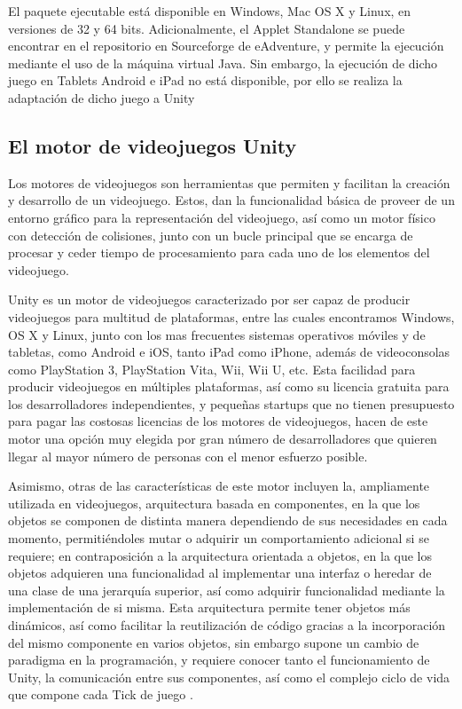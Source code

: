 El paquete ejecutable está disponible en Windows, Mac OS X y Linux, en versiones de 32 y 64 bits. Adicionalmente, el Applet Standalone se puede encontrar en el repositorio en Sourceforge de eAdventure, y permite la ejecución mediante el uso de la máquina virtual Java. Sin embargo, la ejecución de dicho juego en Tablets Android e iPad no está disponible, por ello se realiza la adaptación de dicho juego a Unity 

\subsection{El motor de videojuegos Unity}

Los motores de videojuegos son herramientas que permiten y facilitan la creación y desarrollo de un videojuego. Estos, dan la funcionalidad básica de proveer de un entorno gráfico para la representación del videojuego, así como un motor físico con detección de colisiones, junto con un bucle principal que se encarga de procesar y ceder tiempo de procesamiento para cada uno de los elementos del videojuego.

Unity es un motor de videojuegos caracterizado por ser capaz de producir videojuegos para multitud de plataformas, entre las cuales encontramos Windows, OS X y Linux, junto con los mas frecuentes sistemas operativos móviles y de tabletas, como Android e  iOS, tanto iPad como iPhone, además de videoconsolas como PlayStation 3, PlayStation Vita, Wii, Wii U, etc. Esta facilidad para producir videojuegos en múltiples plataformas, así como su licencia gratuita para los desarrolladores independientes, y pequeñas startups que no tienen presupuesto para pagar las costosas licencias de los motores de videojuegos, hacen de este motor una opción muy elegida por gran número de desarrolladores que quieren llegar al mayor número de personas con el menor esfuerzo posible.

Asimismo, otras de las características de este motor incluyen la, ampliamente utilizada en videojuegos, arquitectura basada en componentes, en la que los objetos se componen de distinta manera dependiendo de sus necesidades en cada momento, permitiéndoles mutar o adquirir un comportamiento adicional si se requiere; en contraposición a la arquitectura orientada a objetos, en la que los objetos adquieren una funcionalidad al implementar una interfaz o heredar de una clase de una jerarquía superior, así como adquirir funcionalidad mediante la implementación de si misma. Esta arquitectura permite tener objetos más dinámicos, así como facilitar la reutilización de código gracias a la incorporación del mismo componente en varios objetos, sin embargo supone un cambio de paradigma en la programación, y requiere conocer tanto el funcionamiento de Unity, la comunicación entre sus componentes, así como el complejo ciclo de vida que compone cada Tick de juego \cite{unitymanual}.

